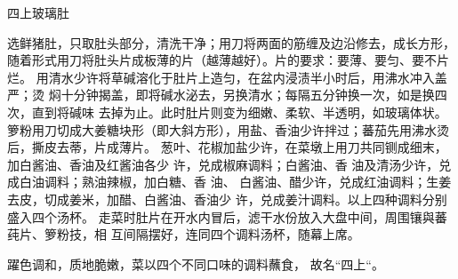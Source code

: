 \begin{recipe}{四上玻璃肚}

\ingredients


\cooking

\step 选鲜猪肚，只取肚头部分，清洗干净；用刀将两面的筋缠及边沿修去，成长方形，
随着形式用刀将肚头片成板薄的片（越薄越好）。片的要求：要薄、要匀、要不片烂。
\step 用清水少许将草碱溶化于肚片上造匀，在盆内浸渍半小时后，用沸水冲入盖严；烫
焖十分钟揭盖，即将碱水泌去，另换清水；每隔五分钟换一次，如是换四次，直到将碱味
去掉为止。此时肚片则变为细嫩、柔软、半透明，如玻璃体状。
\step 箩粉用刀切成大姜糖块形（即大斜方形），用盐、香油少许拌过；蕃茄先用沸水烫
后，撕皮去蒂，片成薄片。
\step 葱叶、花椒加盐少许，在菜墩上用刀共同铡成细末，加白酱油、香油及红酱油各少
许，兑成椒麻调料；白酱油、香 油及清汤少许，兑成白油调料；熟油辣椒，加白糖、香
油、 白酱油、醋少许，兑成红油调料；生姜去皮，切成姜米，加醋、白酱油、香油少
许，兑成姜汁调料。以上四种调料分别 盛入四个汤杯。
\step 走菜时肚片在开水内冒后，滤干水份放入大盘中间，周围镶與蕃莼片、箩粉技，相
互间隔摆好，连同四个调料汤杯，随幕上席。

\features

躍色调和，质地脆嫩，菜以四个不同口味的调料蘸食， 故名“四上“。

\end{recipe}

